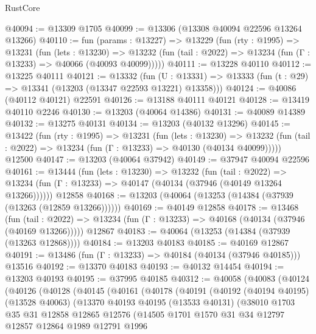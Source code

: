 \begin{lexlean}{RustCore}
\begin{coremodule}
@40094 := @13309 @1705
@40099 := @13306 (@13308 @40094 @22596 @13264 @13266)
@40110 := fun (params : @13227) =>
  @13229
    (fun (rty : @1995) =>
    @13231
      (fun (lets : @13230) =>
      @13232 (fun (tail : @2022) => @13234 (fun (Γ : @13233) => @40066 (@40093 @40099)))))
@40111 := @13228 @40110
@40112 := @13225 @40111
@40121 := @13332
    (fun (U : @13331) => @13333 (fun (t : @29) => @13341 (@13203 (@13347 @22593 @13221) @13358)))
@40124 := @40086 (@40112 @40121) @22591
@40126 := @13188 @40111 @40121
@40128 := @13419 @40110 @2246
@40130 := @13203 (@40064 @14386)
@40131 := @40089 @14389
@40132 := @13275 @40131
@40134 := @13203 (@40132 @13296)
@40145 := @13422
    (fun (rty : @1995) =>
    @13231
      (fun (lets : @13230) =>
      @13232 (fun (tail : @2022) => @13234 (fun (Γ : @13233) => @40130 (@40134 @40099)))))
    @12500
@40147 := @13203 (@40064 @37942)
@40149 := @37947 @40094 @22596
@40161 := @13444
    (fun (lets : @13230) =>
    @13232
      (fun (tail : @2022) =>
      @13234 (fun (Γ : @13233) => @40147 (@40134 (@37946 (@40149 @13264 @13266))))))
    @12858
@40168 := @13203 (@40064 (@13253 (@14384 (@37939 (@13263 (@12859 @13266))))))
@40169 := @40149 @12858
@40178 := @13468
    (fun (tail : @2022) => @13234 (fun (Γ : @13233) => @40168 (@40134 (@37946 (@40169 @13266)))))
    @12867
@40183 := @40064 (@13253 (@14384 (@37939 (@13263 @12868))))
@40184 := @13203 @40183
@40185 := @40169 @12867
@40191 := @13486 (fun (Γ : @13233) => @40184 (@40134 (@37946 @40185))) @13516
@40192 := @13370 @40183
@40193 := @40132 @14454
@40194 := @13203 @40193
@40195 := @37995 @40185
@40312 := @40058
    (@40083
      (@40124
        (@40126
          (@40128
            (@40145
              (@40161
                (@40178
                  (@40191
                    (@40192
                      (@40194 @40195)
                      (@13528 @40063)
                      (@13370
                        @40193
                        @40195
                        (@13533 @40131)
                        (@38010
                          @1703
                          @35
                          @31
                          @12858
                          @12865
                          @12576
                          (@14505
                            @1701
                            @1570
                            @31
                            @34
                            @12797
                            @12857
                            @12864
                            @1989
                            @12791
                            @1996

\end{coremodule}
\end{lexlean}

